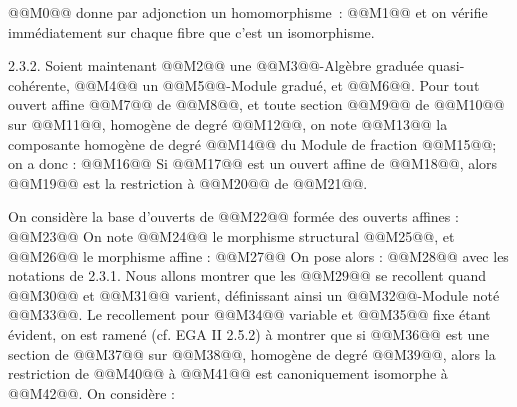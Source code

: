 
@@M0@@
donne par adjonction un homomorphisme~:
@@M1@@
et on vérifie immédiatement sur chaque fibre que c'est un isomorphisme.

2.3.2. Soient maintenant @@M2@@ une @@M3@@-Algèbre graduée quasi-cohérente, @@M4@@ un @@M5@@-Module gradué, et @@M6@@. Pour tout ouvert affine @@M7@@ de @@M8@@, et toute section @@M9@@ de @@M10@@ sur @@M11@@, homogène de degré @@M12@@, on note @@M13@@ la composante homogène de degré @@M14@@ du Module de fraction @@M15@@; on a donc :
@@M16@@
Si @@M17@@ est un ouvert affine de @@M18@@, alors @@M19@@ est la restriction à @@M20@@ de @@M21@@.

On considère la base d'ouverts de @@M22@@ formée des ouverts affines :
@@M23@@
On note @@M24@@ le morphisme structural @@M25@@, et @@M26@@ le morphisme affine :
@@M27@@
On pose alors :
@@M28@@
avec les notations de 2.3.1. Nous allons montrer que les @@M29@@ se recollent quand @@M30@@ et @@M31@@ varient, définissant ainsi un @@M32@@-Module noté @@M33@@. Le recollement pour @@M34@@ variable et @@M35@@ fixe étant évident, on est ramené (cf. EGA II 2.5.2) à montrer que si @@M36@@ est une section de @@M37@@ sur @@M38@@, homogène de degré @@M39@@, alors la restriction de @@M40@@ à @@M41@@ est canoniquement isomorphe à @@M42@@. On considère :
